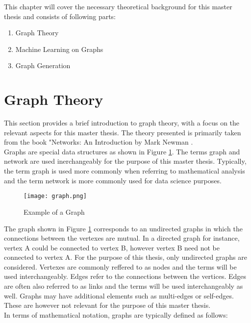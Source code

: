 
	This chapter will cover the necessary theoretical background for this
	master thesis and consists of following parts:

	\begin{enumerate}
		\item Graph Theory
		\item Machine Learning on Graphs
		\item Graph Generation
    \end{enumerate}

	\section{Graph Theory}

	This section provides a brief introduction to graph theory, with a focus on
	the relevant aspects for this master thesis. The theory presented is
	primarily taken from the book "Networks: An Introduction by Mark Newman
	\citeyearpar{Newman2010}. \\ 

	\noindent Graphs are special data structures as shown in Figure \ref{fig:graph}. The 
	terms graph and network are used inerchangeably for the purpose of this 
	master thesis. Typically, the term graph is used more commonly when referring 
	to mathematical analysis and the term network is more commonly used for data
	science purposes.

	\begin{figure}[h]
		\centering
		\texttt{[image: graph.png]}
		\caption{Example of a Graph}
		\cite[p. 111]{Newman2010}
		\label{fig:graph}
	\end{figure}
	
	\noindent The graph shown in Figure \ref{fig:graph} corresponds to an undirected graphs
	in which the connections between the vertexes are mutual. In a directed
	graph for instance, vertex A could be connected to vertex B, however vertex
	B need not be connected to vertex A. For the purpose of this thesis, only
	undirected graphs are considered. Vertexes are commonly reffered to as
	nodes and the terms will be used interchangeably. Edges refer to the
	connections between the vertices. Edges are often also referred to as links
	and the terms will be used interchangeably as well. Graphs may have
	additional elements such as multi-edges or self-edges. These are however
	not relevant for the purpose of this master thesis. \\

	\noindent In terms of mathematical notation, graphs are typically defined
	as follows:

